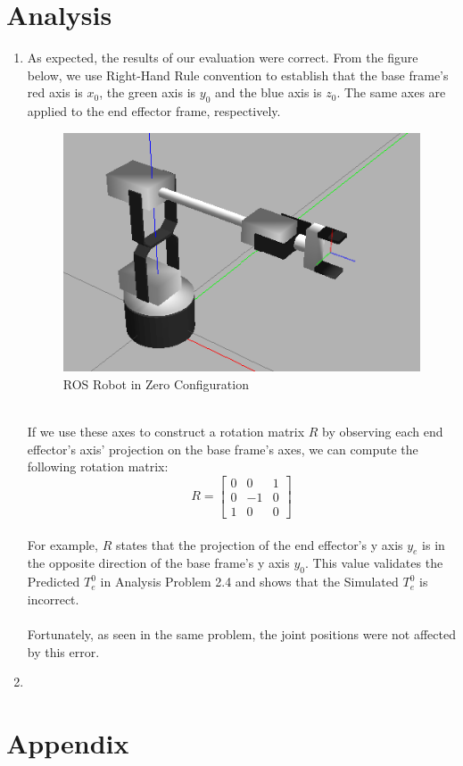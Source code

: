 \documentclass[12pt]{article}
\begin{document}
\section{Analysis}
\begin{enumerate}
\item As expected, the results of our evaluation were correct. From the figure below, we use Right-Hand Rule convention to establish that the base frame's red axis is $x_{0}$, the green axis is $y_{0}$ and the blue axis is $z_{0}$. The same axes are applied to the end effector frame, respectively. \\\begin{figure} [h]
	\centering 
	\includegraphics[scale=2]{ImageOfRobotZeroConfig.png}
	\caption{ROS Robot in Zero Configuration}
	\end{figure} \\
If we use these axes to construct a rotation matrix $R$ by observing each end effector's axis' projection on the base frame's axes, we can compute the following rotation matrix:
\\
\begin{equation}
R = \begin{bmatrix}
	0 & 0 & 1 \\
	0 & -1 & 0\\
	1 & 0 & 0
	\end{bmatrix}
\end{equation}
\\
For example, $R$ states that the projection of the end effector's y axis $y_{e}$ is in the opposite direction of the base frame's y axis $y_{0}$. This value validates the Predicted $T^{0}_{e}$ in Analysis Problem 2.4 and shows that the Simulated $T^{0}_{e}$ is incorrect.\\\\Fortunately, as seen in the same problem, the joint positions were not affected by this error.


\item 
\end{enumerate}

\section{Appendix}
\end{document}
